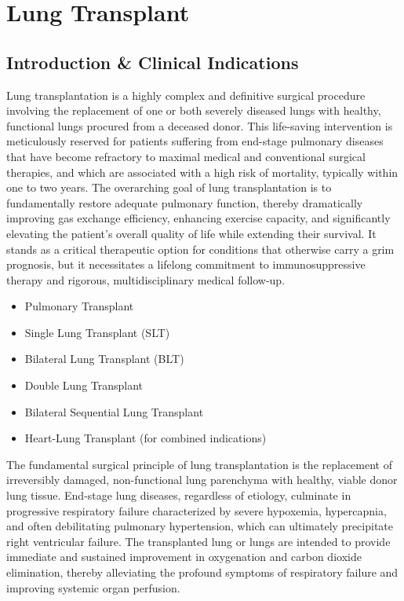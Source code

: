 \chapter{Lung Transplant}

\section*{Introduction \& Clinical Indications}
Lung transplantation is a highly complex and definitive surgical procedure involving the replacement of one or both severely diseased lungs with healthy, functional lungs procured from a deceased donor. This life-saving intervention is meticulously reserved for patients suffering from end-stage pulmonary diseases that have become refractory to maximal medical and conventional surgical therapies, and which are associated with a high risk of mortality, typically within one to two years. The overarching goal of lung transplantation is to fundamentally restore adequate pulmonary function, thereby dramatically improving gas exchange efficiency, enhancing exercise capacity, and significantly elevating the patient's overall quality of life while extending their survival. It stands as a critical therapeutic option for conditions that otherwise carry a grim prognosis, but it necessitates a lifelong commitment to immunosuppressive therapy and rigorous, multidisciplinary medical follow-up.

\begin{itemize}
  \item Pulmonary Transplant
  \item Single Lung Transplant (SLT)
  \item Bilateral Lung Transplant (BLT)
  \item Double Lung Transplant
  \item Bilateral Sequential Lung Transplant
  \item Heart-Lung Transplant (for combined indications)
\end{itemize}

The fundamental surgical principle of lung transplantation is the replacement of irreversibly damaged, non-functional lung parenchyma with healthy, viable donor lung tissue. End-stage lung diseases, regardless of etiology, culminate in progressive respiratory failure characterized by severe hypoxemia, hypercapnia, and often debilitating pulmonary hypertension, which can ultimately precipitate right ventricular failure. The transplanted lung or lungs are intended to provide immediate and sustained improvement in oxygenation and carbon dioxide elimination, thereby alleviating the profound symptoms of respiratory failure and improving systemic organ perfusion.

